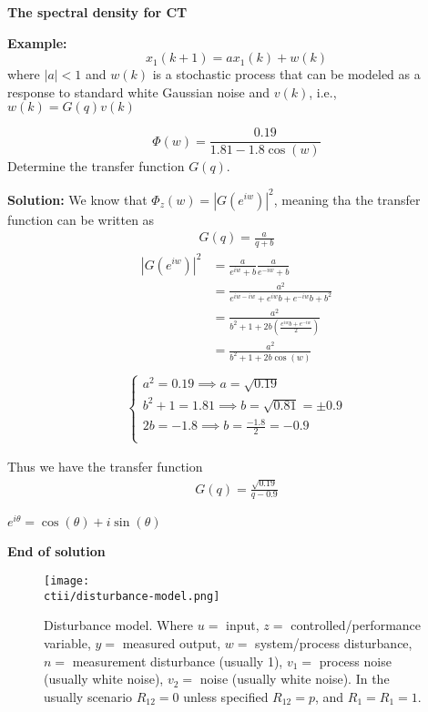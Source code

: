 \begin{multicols}{2}
\textbf{The spectral density for CT}

\textbf{Example:}
\begin{equation*}
    x_1(k+1) = ax_1(k) + w(k)
\end{equation*}
where $|a|<1$ and $w(k)$ is a stochastic process that can be modeled as a 
response to standard white Gaussian noise and $v(k)$, i.e., $w(k)=G(q)v(k)$

\begin{equation*}
    \Phi(w) = \frac{0.19}{1.81-1.8\cos(w)}
\end{equation*}
Determine the transfer function $G(q)$.

\textbf{Solution:}
We know that $\Phi_z(w) = |G(e^{iw})|^2$, meaning tha the transfer function can be written as
\begin{align*}
    G(q) = \frac{a}{q+b}
\end{align*}
\begin{align*}
    |G(e^{iw})|^2 &= \frac{a}{e^{iw}+b} \frac{a}{e^{-iw}+b} \\
     &= \frac{a^2}{e^{iw-iw}+e^{iw}b+e^{-iw}b+b^2} \\
     &= \frac{a^2}{b^2 + 1 + 2b\left(\frac{e^{iw}b+e^{-iw}}{2}\right)} \\
     &= \frac{a^2}{b^2 + 1 + 2b\cos(w)} \\
\end{align*}
\begin{align*}
    \begin{cases}
        a^2 = 0.19 \implies a = \sqrt{0.19}\\
        b^2 + 1 = 1.81 \implies b = \sqrt{0.81} = \pm0.9 \\
        2b = -1.8 \implies b=\frac{-1.8}{2} = -0.9 \\
    \end{cases}
\end{align*}

Thus we have the transfer function
\begin{align*}
    G(q) =  \frac{\sqrt{0.19}}{q - 0.9}
\end{align*}

$e^{i\theta}=\cos(\theta) + i\sin(\theta)$

\textbf{End of solution}

\begin{figure}[H]
    \centering
    \texttt{[image: \\ctii/disturbance-model.png]}
    \caption{Disturbance model. Where $u =$ input, $z =$ controlled/performance variable, 
    $y =$ measured output, $w =$ system/process disturbance, $n =$ measurement disturbance (usually 1), 
    $v_1 =$ process noise (usually white noise), $v_2 =$ noise (usually white noise). 
    In the usually scenario $R_{12}=0$ unless specified $R_{12}=p$, and $R_{1}=R_{1}=1$.}
\end{figure}


\end{multicols}

